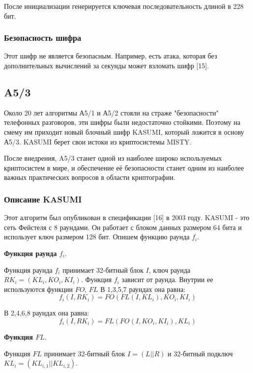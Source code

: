 \documentclass[colorthm]{./civarticle}
\begin{document}
После инициализации генерируется ключевая последовательность длиной в 228 бит.

\subsubsection{Безопасность шифра} 

Этот шифр не является безопасным. Например, есть атака, которая без дополнительных вычислений за секунды может взломать шифр [15].

\subsection{A5/3}

Около 20 лет алгоритмы А5/1 и А5/2 стояли на страже "безопасности" телефонных разговоров, эти шифры были недостаточно стойкими. Поэтому на смему им приходит новый блочный шифр KASUMI, который ложится в основу А5/3. KASUMI берет свои истоки из криптосистемы MISTY. 

После внедрения, A5/3 станет одной из наиболее широко используемых криптосистем в мире, и обеспечение её безопасности станет одним из наиболее важных практических вопросов в области криптографии.

\subsubsection{Описание KASUMI}

Этот алгоритм был опубликован в спецификации [16] в 2003 году. KASUMI - это сеть Фейстеля с 8 раундами. Он работает с блоком данных размером 64 бита и использует ключ размером 128 бит. Опишем функцию раунда $f_i$.

\textbf{Функция раунда $f_i$}. 

Функция раунда $f_i$ принимает 32-битный блок $I$, ключ раунда $RK_i = (KL_i, KO_i, KI_i)$. Функция $f_i$ зависит от раунда. Внутрии ее используются функции $FO$, $FL$ В 1,3,5,7 раундах она равна:
\begin{equation}
    f_i(I, RK_i) = FO(FL(I, KL_i), KO_i, KI_i)
\end{equation}

В 2,4,6,8 раундах она равна:
\begin{equation}
    f_i(I, RK_i) = FL(FO(I, KO_i, KI_i), KL_i)
\end{equation}

\textbf{Функция $FL$}.

Функция $FL$ принимает 32-битный блок $I=(L||R)$ и 32-битный подключ $KL_i = (KL_{i,1}||KL_{i,2})$.
\end{document}
